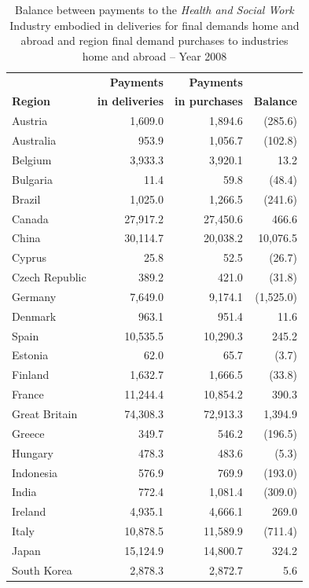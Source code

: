\documentclass[a4paper,12pt]{article}
\begin{document}
\begin{table} %
\caption{Balance between payments to the \textit{Health and Social Work} Industry embodied in deliveries for final demands home and abroad and region final demand purchases to industries home and abroad -- Year 2008} 
\begin{center}
\small \begin{tabular}{lrrr}
 & \textbf{Payments} & \textbf{Payments} & \\ 
\textbf{Region} & \textbf{in deliveries}& \textbf{in purchases} & \textbf{Balance}\\ 
\hline
Austria &  1,609.0  &  1,894.6  & (285.6)\\ 
Australia &  953.9  &  1,056.7  & (102.8)\\ 
Belgium &  3,933.3  &  3,920.1  & 13.2 \\ 
Bulgaria &  11.4  &  59.8  & (48.4)\\ 
Brazil &  1,025.0  &  1,266.5  & (241.6)\\ 
Canada &  27,917.2  &  27,450.6  & 466.6 \\ 
China &  30,114.7  &  20,038.2  & 10,076.5 \\ 
Cyprus &  25.8  &  52.5  & (26.7)\\ 
Czech Republic &  389.2  &  421.0  & (31.8)\\ 
Germany &  7,649.0  &  9,174.1  & (1,525.0)\\ 
Denmark &  963.1  &  951.4  & 11.6 \\ 
Spain &  10,535.5  &  10,290.3  & 245.2 \\ 
Estonia &  62.0  &  65.7  & (3.7)\\ 
Finland &  1,632.7  &  1,666.5  & (33.8)\\ 
France &  11,244.4  &  10,854.2  & 390.3 \\ 
Great Britain &  74,308.3  &  72,913.3  & 1,394.9 \\ 
Greece &  349.7  &  546.2  & (196.5)\\ 
Hungary &  478.3  &  483.6  & (5.3)\\ 
Indonesia &  576.9  &  769.9  & (193.0)\\ 
India &  772.4  &  1,081.4  & (309.0)\\ 
Ireland &  4,935.1  &  4,666.1  & 269.0 \\ 
Italy &  10,878.5  &  11,589.9  & (711.4)\\ 
Japan &  15,124.9  &  14,800.7  & 324.2 \\ 
South Korea &  2,878.3  &  2,872.7  & 5.6 \\ 

\end{tabular}
\end{center}
\end{table}
\end{document}
